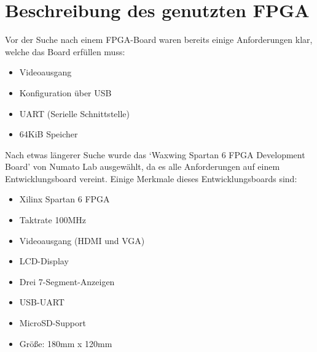 \section{Beschreibung des genutzten FPGA}
Vor der Suche nach einem FPGA-Board waren bereits einige Anforderungen klar,
welche das Board erfüllen muss:
\begin{itemize}
	\item Videoausgang
	\item Konfiguration über USB
	\item \acs{UART} (Serielle Schnittstelle)
	\item 64KiB Speicher
\end{itemize}
Nach etwas längerer Suche wurde das `Waxwing Spartan 6 FPGA Development Board'
von Numato Lab ausgewählt, da es alle Anforderungen auf einem Entwicklungsboard
vereint. Einige Merkmale dieses Entwicklungsboards sind:
\begin{itemize}
	\item Xilinx Spartan 6 FPGA
	\item Taktrate 100MHz
	\item Videoausgang (HDMI und VGA)
	\item LCD-Display
	\item Drei 7-Segment-Anzeigen
	\item USB-UART
	\item MicroSD-Support
	\item Größe: 180mm x 120mm
\end{itemize}
